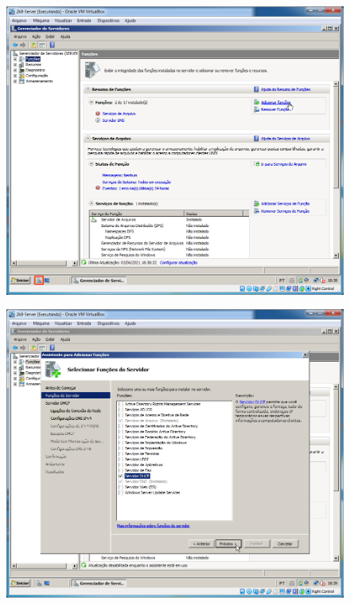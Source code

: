\documentclass[10pt]{article}
\begin{document}
\begin{figure}[H]
    \centering
    \caption{}
    \label{fig:5311}
    \includegraphics[width=\linewidth]{images/windows_server/dhcp/001.png}
\end{figure}
\begin{figure}[H]
    \centering
    \caption{}
    \label{fig:5312}
    \includegraphics[width=\linewidth]{images/windows_server/dhcp/004.png}
\end{figure}
\end{document}
